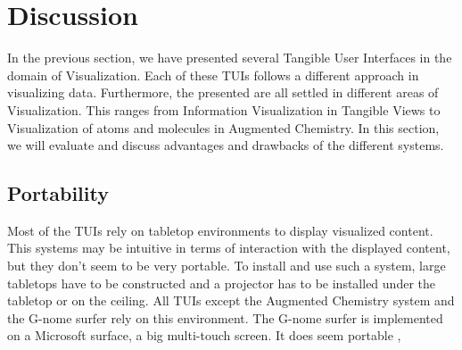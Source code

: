 \section{Discussion}
In the previous section, we have presented several Tangible User Interfaces in the domain of Visualization. Each of these TUIs follows a different approach in visualizing data. Furthermore, the presented are all settled in different areas of Visualization. This ranges from Information Visualization in Tangible Views to Visualization of atoms and molecules in Augmented Chemistry. In this section, we will evaluate and discuss advantages and drawbacks of the different systems. 

\subsection{Portability}
Most of the TUIs rely on tabletop environments to display visualized content. This systems may be intuitive in terms of interaction with the displayed content, but they don't seem to be very portable. To install and use such a system, large tabletops have to be constructed and a projector has to be installed under the tabletop or on the ceiling. All TUIs except the Augmented Chemistry system and the G-nome surfer rely on this environment. The G-nome surfer is implemented on a Microsoft surface, a big multi-touch screen. It does seem portable , 